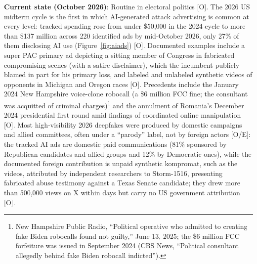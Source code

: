 \documentclass[11pt,letterpaper]{article}
\begin{document}
\textbf{Current state (October 2026)}: Routine in electoral politics [O]. The 2026 US midterm cycle is the first in which AI-generated attack advertising is common at every level: tracked spending rose from under \$50,000 in the 2024 cycle to more than \$137 million across 220 identified ads by mid-October 2026, only 27\% of them disclosing AI use (Figure~\ref{fig:aiads}) [O]. Documented examples include a super PAC primary ad depicting a sitting member of Congress in fabricated compromising scenes (with a satire disclaimer), which the incumbent publicly blamed in part for his primary loss, and labeled and unlabeled synthetic videos of opponents in Michigan and Oregon races [O]. Precedents include the January 2024 New Hampshire voice-clone robocall (a \$6 million FCC fine; the consultant was acquitted of criminal charges)\footnote{New Hampshire Public Radio, ``Political operative who admitted to creating fake Biden robocalls found not guilty,'' June 13, 2025; the \$6 million FCC forfeiture was issued in September 2024 (CBS News, ``Political consultant allegedly behind fake Biden robocall indicted'').} and the annulment of Romania's December 2024 presidential first round amid findings of coordinated online manipulation [O]. Most high-visibility 2026 deepfakes were produced by domestic campaigns and allied committees, often under a ``parody'' label, not by foreign actors [O/E]: the tracked AI ads are domestic paid communications (81\% sponsored by Republican candidates and allied groups and 12\% by Democratic ones), while the documented foreign contribution is unpaid synthetic kompromat, such as the videos, attributed by independent researchers to Storm-1516, presenting fabricated abuse testimony against a Texas Senate candidate; they drew more than 500,000 views on X within days but carry no US government attribution [O].
\end{document}
